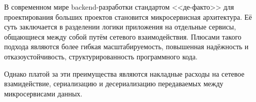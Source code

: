 \label{sec:intro}

В современном мире backend-разработки стандартом <<де-факто>> для проектирования больших проектов становится микросервисная архитектура.
Её суть заключается в разделении логики приложения на отдельные сервисы, общающиеся между собой путём сетевого взаимодействия.
Плюсами такого подхода являются более гибкая масштабируемость, повышенная надёжность и отказоустойчивость, структурированность программного кода.

Однако платой за эти преимущества являются накладные расходы на сетевое взамидействие, сериализацию и десериализацию передаваемых между микросервисами данных.
